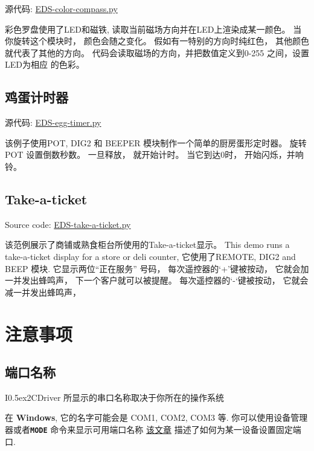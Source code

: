 \documentclass{article}
\newcommand{\two}{\raise0.5ex\hbox{\footnotesize{2}}}
\newcommand{\iicdriver}{I\two{}CDriver}
\newcommand{\mach}[1]{\texttt{\textbf{#1}}}
\begin{document}
源代码: \href{https://github.com/jamesbowman/i2cdriver/blob/master/python/samples/EDS-color-compass.py}{EDS-color-compass.py}

彩色罗盘使用了LED和磁铁, 读取当前磁场方向并在LED上渲染成某一颜色。 
当你旋转这个模块时， 颜色会随之变化。 
假如有一特别的方向时纯红色， 其他颜色就代表了其他的方向。 
代码会读取磁场的方向，并把数值定义到0-255 之间，设置LED为相应 的色彩。 

\subsection{鸡蛋计时器}

源代码: \href{https://github.com/jamesbowman/i2cdriver/blob/master/python/samples/EDS-egg-timer.py}{EDS-egg-timer.py}


该例子使用POT, DIG2 和 BEEPER 模块制作一个简单的厨房蛋形定时器。 
旋转POT 设置倒数秒数。 一旦释放， 就开始计时。 当它到达0时， 开始闪烁，并响铃。 

\subsection{Take-a-ticket}

Source code: \href{https://github.com/jamesbowman/i2cdriver/blob/master/python/samples/EDS-take-a-ticket.py}{EDS-take-a-ticket.py}

该范例展示了商铺或熟食柜台所使用的Take-a-ticket显示。 
This demo runs a take-a-ticket display for a store or deli counter,
它使用了REMOTE, DIG2 and BEEP 模块.
它显示两位“正在服务” 号码， 每次遥控器的‘+’键被按动， 它就会加一并发出蜂鸣声， 
下一个客户就可以被提醒。  每次遥控器的‘-‘键被按动， 它就会减一并发出蜂鸣声， 


\newpage
\section{注意事项}

\subsection{端口名称}

\iicdriver{} 所显示的串口名称取决于你所在的操作系统

在 \textbf{Windows}, 它的名字可能会是  COM1, COM2, COM3 等.
你可以使用设备管理器或者\mach{MODE} 命令来显示可用端口名称
\href{https://plugable.com/2011/07/04/how-to-change-the-com-port-for-a-usb-serial-adapter-on-windows-7/}{该文章}
描述了如何为某一设备设置固定端口.
\end{document}
